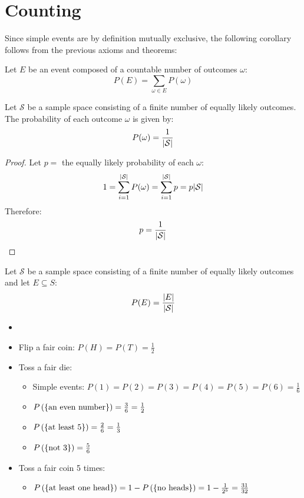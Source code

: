 \documentclass[letterpaper,12pt,fleqn]{article}
\newcommand{\w}{\omega}
\renewcommand{\S}{\mathcal{S}}
\begin{document}
\section*{Counting}

Since simple events are by definition mutually exclusive, the following corollary follows from the previous axioms and
theorems:

\begin{corollary}
  Let \(E\) be an event composed of a countable number of outcomes \(\w\):
  \[P(E)=\sum_{\w\in E}P(\w)\]
\end{corollary}

\begin{theorem}
  Let \(\S\) be a sample space consisting of a finite number of equally likely outcomes.  The probability of each outcome
  \(\w\) is given by:
  \[P(\w)=\frac{1}{\abs{\S}}\]
\end{theorem}

\begin{proof}
  Let \(p=\) the equally likely probability of each \(\w\):
  \[1=\sum_{i=1}^{\abs{\S}}P(\w)=\sum_{i=1}^{\abs{\S}}p=p\abs{\S}\]
  Therefore:
  \[p=\frac{1}{\abs{\S}}\]
\end{proof}

\begin{corollary}
  Let \(\S\) be a sample space consisting of a finite number of equally likely outcomes and let \(E\subseteq S\):
  \[P(E)=\frac{\abs{E}}{\abs{\S}}\]
\end{corollary}

\begin{examples}
  \begin{itemize}
  \item[]
  \item Flip a fair coin: \(P(H)=P(T)=\frac{1}{2}\)
  \item Toss a fair die:
    \begin{itemize}
    \item Simple events: \(P(1)=P(2)=P(3)=P(4)=P(5)=P(6)=\frac{1}{6}\)
    \item \(P\left(\{\text{an even number}\}\right)=\frac{3}{6}=\frac{1}{2}\)
    \item \(P\left(\{\text{at least 5}\}\right)=\frac{2}{6}=\frac{1}{3}\)
    \item \(P\left(\{\text{not 3}\}\right)=\frac{5}{6}\)
    \end{itemize}
  \item Toss a fair coin 5 times:
    \begin{itemize}
    \item \(P\left(\{\text{at least one head}\}\right)=1-P\left(\{\text{no heads}\}\right)=1-\frac{1}{2^5}=
      \frac{31}{32}\)
    \end{itemize}
  \end{itemize}
\end{examples}
\end{document}

